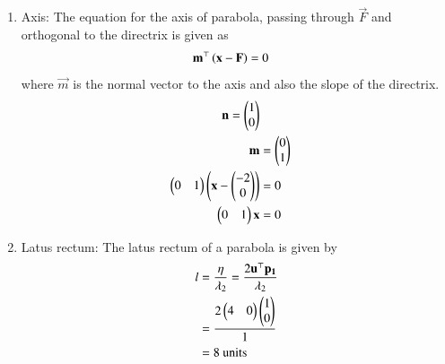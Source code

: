 \documentclass[journal,12pt,twocolumn]{IEEEtran}
\begin{document}
\begin{enumerate}
\begin{enumerate}
\item Axis: The equation for the axis of parabola, passing through $\vec{F}$ and orthogonal to the directrix is given as  
\begin{align}
\mathbf{m}^\top\left(\mathbf{x}-\mathbf{F}\right) &= 0
\label{eq:4}
\end{align}
where $\vec{m}$ is the normal vector to the axis and also the slope of the directrix.
\begin{align}
\mathbf{n} = \begin{pmatrix}1 \\ 0 \end{pmatrix}\\
\mathbf{m} &= \begin{pmatrix}0 \\ 1\end{pmatrix} \\
\begin{pmatrix}0 & 1\end{pmatrix}\begin{pmatrix}\mathbf{x} - \begin{pmatrix}-2 \\ 0\end{pmatrix}\end{pmatrix} &= 0\\
\begin{pmatrix}0 & 1\end{pmatrix}\mathbf{x} &= 0 
\end{align}
\item Latus rectum: The latus rectum of a parabola is given by 
\begin{align}
	l &= \frac{\eta}{\lambda_2}  
	 = \frac{2\mathbf{u}^\top\mathbf{p_1}}{\lambda_2} \\
	 &= \frac{2\begin{pmatrix}4 & 0\end{pmatrix}\begin{pmatrix}1 \\ 0\end{pmatrix}}{1} \\
	 &= 8 \text{ units }
\end{align}
\end{enumerate}
\end{enumerate}
\end{document}
